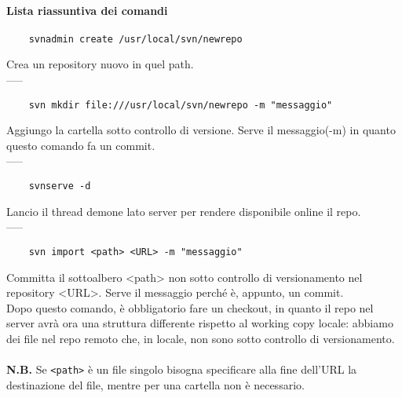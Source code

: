 \documentclass[a4paper]{article}
\begin{document}
	\paragraph{Lista riassuntiva dei comandi\\}
	\begin{verbatim}
	svnadmin create /usr/local/svn/newrepo
	\end{verbatim}
	Crea un repository nuovo in quel path.\\-----
	\begin{verbatim}
	svn mkdir file:///usr/local/svn/newrepo -m "messaggio"
	\end{verbatim}
	Aggiungo la cartella sotto controllo di versione. Serve il messaggio(-m) in quanto questo comando fa un commit.\\-----
	\begin{verbatim}
	svnserve -d
	\end{verbatim}
	Lancio il thread demone lato server per rendere disponibile online il repo.\\-----
	\begin{verbatim}
	svn import <path> <URL> -m "messaggio"
	\end{verbatim} 
	Committa il sottoalbero <path> non sotto controllo di versionamento nel repository <URL>. Serve il messaggio perché è, appunto, un commit.\\
	Dopo questo comando, è obbligatorio fare un checkout, in quanto il repo nel server avrà ora una struttura differente rispetto al working copy locale: 
	abbiamo dei file nel repo remoto che, in locale, non sono sotto controllo di versionamento.\\
	\\
	\textbf{N.B.} Se \verb|<path>| è un file singolo bisogna specificare alla fine dell'URL la destinazione del file, mentre
	per una cartella non è necessario.
	
\end{document}
